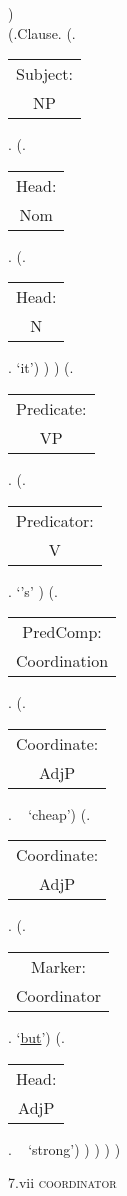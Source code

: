 \documentclass[12pt,letterpaper]{article}
\begin{document}
\begin{figure}
\begin{center}
\begin{parsetree}
			)
			\\\hfill \break\hfill \break
			(.Clause.
			(.\begin{tabular}{c}Subject:\\NP\end{tabular}.
			(.\begin{tabular}{c}Head:\\Nom\end{tabular}.
			(.\begin{tabular}{c}Head:\\N\end{tabular}. `it')
			)
			)
			(.\begin{tabular}{c}Predicate:\\VP\end{tabular}.
			(.\begin{tabular}{c}Predicator:\\V\end{tabular}. `{'s}' )
			(.\begin{tabular}{c}PredComp:\\Coordination\end{tabular}.
			(.\begin{tabular}{c}Coordinate:\\AdjP\end{tabular}. ~ `cheap')
			(.\begin{tabular}{c}Coordinate:\\AdjP\end{tabular}.
			(.\begin{tabular}{c}Marker:\\Coordinator\end{tabular}. `\underline{but}')
			(.\begin{tabular}{c}Head:\\AdjP\end{tabular}. ~ `strong')
			)
			)
			)
			)
			
			\hfill \break\hfill \break
		\end{parsetree}
		7.vii \textsc{coordinator}
	\end{center}
\end{figure}
			
\end{document}

